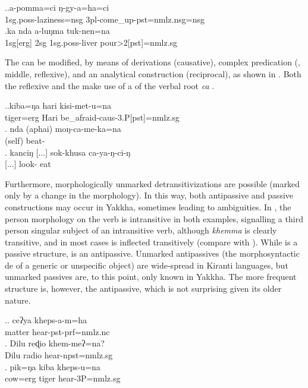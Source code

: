 \ex.\ag.a-pomma=ci ŋ-gy-a=ha=ci\\
{\sc 1sg.poss-}laziness{\sc =nsg} {\sc 3pl-}come\_up{\sc -pst=nmlz.nsg=nsg}\\
\bg.ka nda         a-luŋma  tuk-nen=na\\
{\sc 1sg[erg]} {\sc 2sg} {\sc 1sg.poss-}liver pour{>2[pst]=nmlz.sg}\\


The  can be modified, by means of derivations (causative), complex predication (, middle, reflexive), and an analytical construction (reciprocal), as shown in \Next. Both the  reflexive and the   make use of a  of the verbal root \emph{ca}  . 


\ex.\ag.kiba=ŋa hari kisi-met-u=na\\
tiger{\sc =erg} Hari be\_afraid{\sc -caus-3.P[pst]=nmlz.sg}\\
\bg. nda (aphai) moŋ-ca-me-ka=na\\
 (self) beat-\\
\bg. kanciŋ [...] sok-khusa ca-ya-ŋ-ci-ŋ\\
  [...] look- eat\\



Furthermore, morphologically unmarked detransitivizations are possible (marked only by a change in the  morphology). In this way, both antipassive and passive constructions may occur in Yakkha, sometimes leading to ambiguities. In \Next, the person morphology on the verb is intransitive in both examples, signalling a third person singular subject of an intransitive verb, although \emph{khemma}  is clearly transitive, and in most cases is inflected transitively (compare with \Next[c]). While \Next[a] is a passive structure, \Next[b] is an antipassive. Unmarked antipassives (the morphosyntactic de of a generic or unspecific object) are wide-spread in Kiranti languages, but unmarked passives are, to this point, only known in Yakkha. The more frequent structure is, however, the antipassive, which is not surprising given its older nature.

\ex.\ag. ceʔya kheps-a-m=ha\\
matter hear{\sc [3sg]-pst-prf=nmlz.nc}\\
\bg. Dilu  reɖio khem-meʔ=na?\\
Dilu radio  hear{\sc [3sg]-npst=nmlz.sg}\\
\bg. pik=ŋa kiba kheps-u=na\\
cow{\sc =erg} tiger hear{\sc [pst]-3P=nmlz.sg}\\




